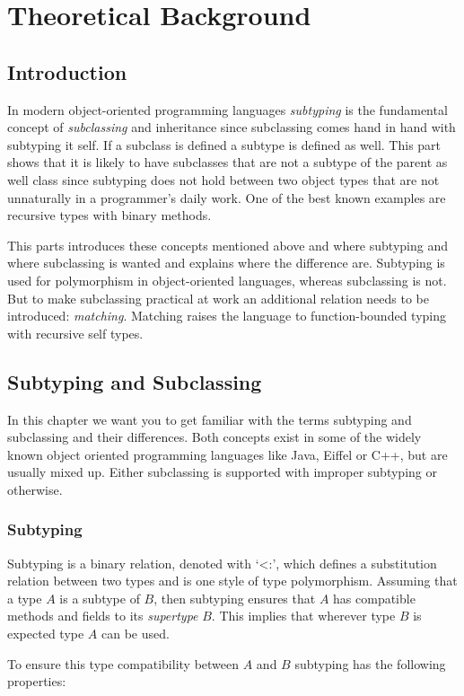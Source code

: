 \chapter{Theoretical Background}
\section{Introduction}
In modern object-oriented programming languages \emph{subtyping} is
the fundamental concept of \emph{subclassing} and inheritance since
subclassing comes hand in hand with subtyping it self. If a subclass
is defined a subtype is defined as well. This part shows that it is
likely to have subclasses that are not a subtype of the parent as well
class since subtyping does not hold between two object types that are
not unnaturally in a programmer's daily work. One of the best known
examples are recursive types with binary methods.

This parts introduces these concepts mentioned above and where subtyping
and where subclassing is wanted and explains where the difference are.  Subtyping
is used for polymorphism in object-oriented languages, whereas subclassing
is not. But to make subclassing practical at work an additional relation
needs to be introduced: \emph{matching}. Matching raises the language
to function-bounded typing with recursive self types.

\section{Subtyping and Subclassing}
\label{chap:subtypingVsSubclassing}
In this chapter we want you to get familiar with the terms subtyping
and subclassing and their differences. Both concepts exist in some of
the widely known object oriented programming languages like Java, Eiffel
or C++, but are usually mixed up. Either subclassing is supported with
improper subtyping or otherwise.

\subsection{Subtyping}
Subtyping is a binary relation, denoted with `<:', which defines
a substitution relation between two types and is one style of type
polymorphism. Assuming that a type $A$ is a subtype of $B$, then subtyping
ensures that $A$ has compatible methods and fields to its \emph{supertype}
$B$. This implies that wherever type $B$ is expected type $A$ can be used.

To ensure this type compatibility between $A$ and $B$ subtyping has the
following properties:

